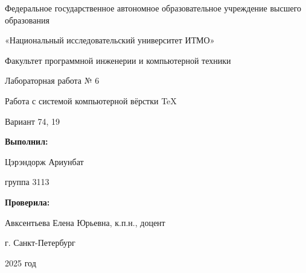 \documentclass[12pt]{article} %
\begin{document}
\begin{center}
\onehalfspacing %

{\large
Федеральное государственное автономное образовательное учреждение высшего образования
}

\vspace{6pt}

{\large
«Национальный исследовательский университет ИТМО»
}

\vspace{32pt}

{\large
Факультет программной инженерии и компьютерной техники
}

\vspace{90pt}

{\Large
Лабораторная работа № 6
}

\vspace{10pt}

{\Large
Работа с системой компьютерной вёрстки \TeX
}

\vspace{12pt}

{\large
Вариант 74, 19
}

\end{center}

\vfill %

\begin{flushright}
\textbf{Выполнил:} %

\vspace{6pt}
Цэрэндорж Ариунбат 

\vspace{6pt}
группа 3113 

\vspace{12pt}
\textbf{Проверила:} %

\vspace{6pt}
Авксентьева Елена Юрьевна, к.п.н., доцент 
\end{flushright}

\vfill

\begin{center}
г. Санкт-Петербург %

\vspace{10pt}
2025 год %
\end{center}
\end{document}
